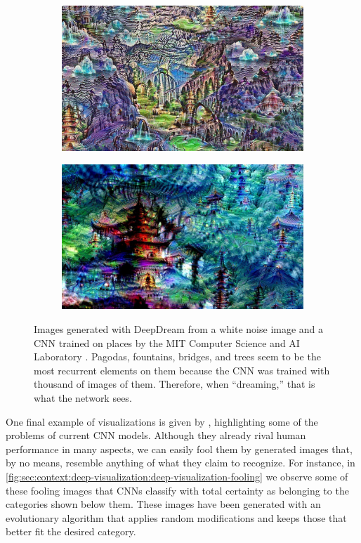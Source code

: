 \begin{figure}[p]
  \begin{subfigure}[b]{\textwidth}
    \includegraphics[width=\textwidth]{gfx/dream-buildings-1}
  \end{subfigure}
  \par\medskip
  \begin{subfigure}[b]{\textwidth}
    \includegraphics[width=\textwidth]{gfx/dream-buildings-2}
  \end{subfigure}
  \caption{
    Images generated with DeepDream from a white noise image and a CNN trained on places by the MIT Computer Science and AI Laboratory \cite{Mordvintsev2015}.
    Pagodas, fountains, bridges, and trees seem to be the most recurrent elements on them because the CNN was trained with thousand of images of them.
    Therefore, when ``dreaming,'' that is what the network sees.
  }
  \label{fig:sec:context:deep-visualization:dream-buildings}
\end{figure}

One final example of visualizations is given by \citet{Nguyen2014}, highlighting some of the problems of current CNN models.
Although they already rival human performance in many aspects, we can easily fool them by generated images that, by no means, resemble anything of what they claim to recognize.
For instance, in \autoref{fig:sec:context:deep-visualization:deep-visualization-fooling} we observe some of these fooling images that CNNs classify with total certainty as belonging to the categories shown below them.
These images have been generated with an evolutionary algorithm that applies random modifications and keeps those that better fit the desired category.

